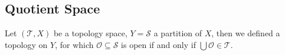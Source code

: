 \subsection{Quotient Space}
\begin{defi}
Let $(\mathcal{T}, X)$ be a topology space, $Y = \mathcal{S}$ a partition of $X$,
then we defined a topology on $Y$,
for which $\mathcal{O} \subseteq \mathcal{S}$ is open if and only if $\bigcup \mathcal{O} \in \mathcal{T}$.
\end{defi}
